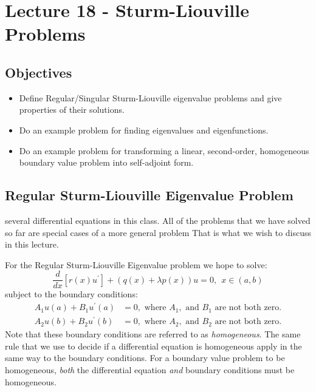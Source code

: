 \chapter{Lecture 18 - Sturm-Liouville Problems}
\label{ch:lec18}
\section{Objectives}
\begin{itemize}
\item Define Regular/Singular Sturm-Liouville eigenvalue problems and give properties of their solutions.
\item Do an example problem for finding eigenvalues and eigenfunctions.
\item Do an example problem for transforming a linear, second-order, homogeneous boundary value problem into self-adjoint form.
\end{itemize}

\section{Regular Sturm-Liouville Eigenvalue Problem} 
 several differential equations in this class.  All of the problems that we have solved so far are special cases of a more general problem  That is what we wish to discuss in this lecture.

For the Regular Sturm-Liouville Eigenvalue problem we hope to solve:
\begin{equation}
\frac{d}{dx}\left[r(x)u^{\prime}\right] + \left(q(x) + \lambda p(x)\right)u = 0,  \ \ x\in(a,b)
\label{eq:sturm-liouville-evp}
\end{equation}
subject to the boundary conditions:
\begin{align*}
A_1u(a) + B_1u^{\prime}(a) &= 0, \text{ where }A_1,\text{ and }B_1\text{ are not both zero.} \\
A_2u(b) + B_2u^{\prime}(b) &= 0, \text{ where }A_2,\text{ and }B_2\text{ are not both zero.}
\end{align*}
Note that these boundary conditions are referred to as \emph{homogeneous}.  The same rule that we use to decide if a differential equation is homogeneous apply in the same way to the boundary conditions.  For a boundary value problem to be homogeneous, \emph{both} the differential equation \emph{and} boundary conditions must be homogeneous.

